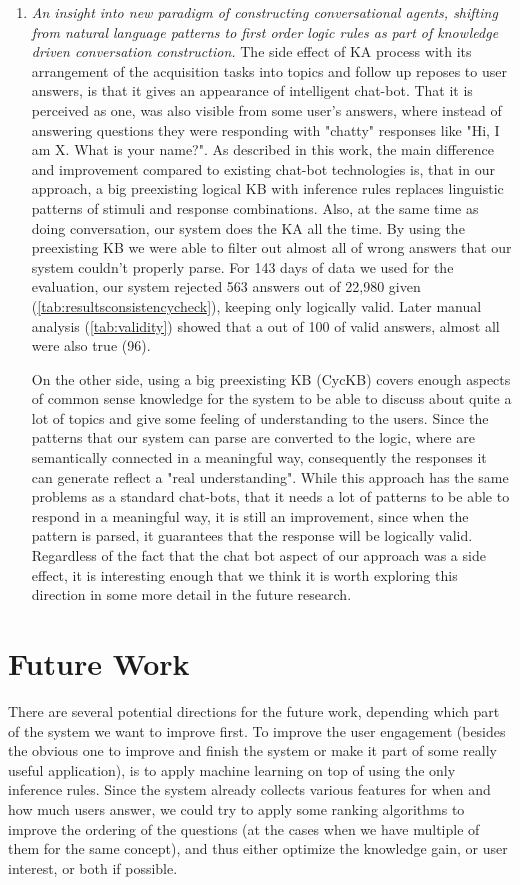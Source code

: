 \begin{enumerate}
	\item \emph{An insight into new paradigm of constructing conversational agents,	shifting from natural language patterns to first order logic rules as part of knowledge driven conversation construction.} 
	The side effect of KA process with its arrangement of the acquisition tasks into topics and follow up reposes to user answers, is that it gives an appearance of  intelligent	chat-bot. That it is perceived as one, was also visible from some user's answers, where instead of answering questions they were responding with "chatty" responses like "Hi, I am X. What is your name?".
	As described in this work, the main difference and improvement compared to existing chat-bot technologies is, that in our approach, a big preexisting logical KB with	inference rules replaces linguistic patterns of stimuli and response combinations. Also, at the same time as doing conversation, 
	our system does the KA all the time. By using the preexisting KB we were able to	filter out almost all of wrong answers that our system couldn't
	properly parse. For 143 days
	of data we used for the evaluation, our system rejected 563 answers out of 22,980 given (\autoref{tab:resultsconsistencycheck}), keeping only logically valid. Later manual analysis (\autoref{tab:validity}) showed that a out of 100 of valid answers, almost all were also true (96).
	
	On the other side, using	a big preexisting KB (CycKB) covers enough aspects of common sense knowledge for the system to be able to discuss about quite a lot of topics and give some feeling of understanding to the users. Since the patterns that our system
	can parse are converted to the logic, where are semantically connected 
	in a meaningful way, consequently the responses it can generate reflect a "real understanding". While this approach has the same problems as a standard chat-bots, that it needs a lot of patterns to be able to respond
	in a meaningful way, it is still an improvement, since when the pattern is
	parsed, it guarantees that the response will be logically valid. Regardless of the fact that the chat bot aspect of our approach was a side effect, it
	is interesting enough that we think it is worth exploring this direction in some more detail in the future research. 
\end{enumerate}

\section{Future Work}
There are several potential directions for the future work, depending which 
part of the system we want to improve first. 
To improve the user engagement (besides the obvious one to improve and finish
the system or make it part of some really useful application), is to apply
machine learning on top of using the only inference rules. Since the system
already collects various features for when and how much users answer, we could
try to apply some ranking algorithms to improve the ordering of the questions 
(at the cases when we have multiple of them for the same concept), and thus
either optimize the knowledge gain, or user interest, or both if possible.

